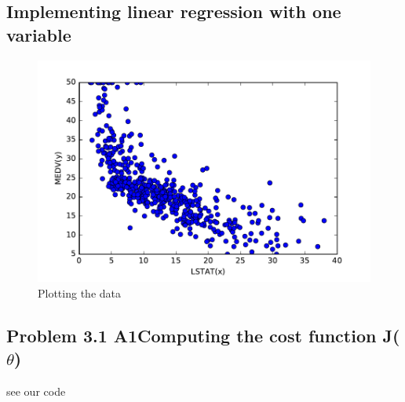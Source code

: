 \documentclass[pdftex,11pt]{article}
\begin{document}
\subsection{Implementing linear regression with one variable}

\begin{figure}
  \caption{Plotting the data}
  \centering
    \includegraphics[scale=1]{fig1.pdf}
\end{figure}
\subsection{Problem 3.1 A1Computing the cost function J($\theta$)}
see our code 
\end{document}
